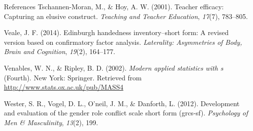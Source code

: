 \documentclass[ignorenonframetext,]{beamer}
\begin{document}
\begin{frame}[allowframebreaks]{References}
\leavevmode\hypertarget{ref-tschannen2001teacher}{}%
Tschannen-Moran, M., \& Hoy, A. W. (2001). Teacher efficacy: Capturing
an elusive construct. \emph{Teaching and Teacher Education},
\emph{17}(7), 783--805.

\leavevmode\hypertarget{ref-veale2014edinburgh}{}%
Veale, J. F. (2014). Edinburgh handedness inventory--short form: A
revised version based on confirmatory factor analysis. \emph{Laterality:
Asymmetries of Body, Brain and Cognition}, \emph{19}(2), 164--177.

\leavevmode\hypertarget{ref-Venables2002}{}%
Venables, W. N., \& Ripley, B. D. (2002). \emph{Modern applied
statistics with s} (Fourth). New York: Springer. Retrieved from
\url{http://www.stats.ox.ac.uk/pub/MASS4}

\leavevmode\hypertarget{ref-wester2012development}{}%
Wester, S. R., Vogel, D. L., O'neil, J. M., \& Danforth, L. (2012).
Development and evaluation of the gender role conflict scale short form
(grcs-sf). \emph{Psychology of Men \& Masculinity}, \emph{13}(2), 199.

\end{frame}
\end{document}
